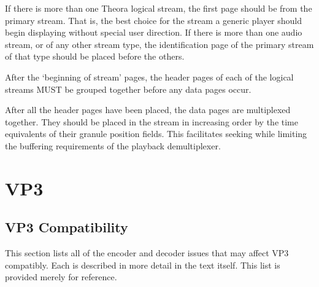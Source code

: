 \documentclass[9pt,letterpaper]{book}
\numberwithin{equation}{chapter}
\numberwithin{figure}{chapter}
\numberwithin{table}{chapter}
\begin{document}
If there is more than one Theora logical stream, the first page should
 be from the primary stream.
That is, the best choice for the stream a generic player should begin
 displaying without special user direction.
If there is more than one audio stream, or of any other stream
 type, the identification page of the primary stream of that type
 should be placed before the others.

After the `beginning of stream' pages, the header pages of each of
 the logical streams MUST be grouped together before any data pages
 occur.

After all the header pages have been placed,
 the data pages are multiplexed together.
They should be placed in the stream in increasing order by the 
 time equivalents of their granule position fields.
This facilitates seeking while limiting the buffering requirements of the
 playback demultiplexer.

\cleardoublepage
\chapter{VP3}

\section{VP3 Compatibility}
\label{app:vp3-compat}
This section lists all of the encoder and decoder issues that may affect VP3
 compatibly.
Each is described in more detail in the text itself.
This list is provided merely for reference.
\end{document}
